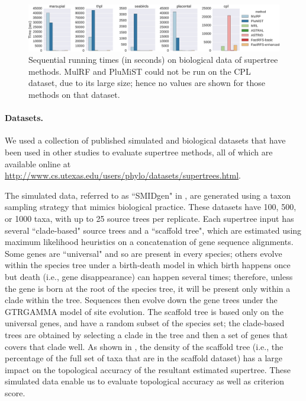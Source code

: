  \begin{figure}
     \centering
     \includegraphics[width=\textwidth]{fastrfs-figs/bio-timing.eps}
     \caption[Running times of FastRFS and other supertree methods on five biological datasets]{Sequential running times (in seconds) on biological data of supertree methods. 
 MulRF and PluMiST could not be run on the CPL dataset, due to its large size; hence
 no values are shown for those methods on that dataset.
 }
     \label{fastrfs::fig:bio-timing}
 \end{figure}




\paragraph{\bf Datasets.  }
We used a collection of published simulated and biological datasets that
have been used in other studies \cite{smidgen} to evaluate supertree methods,
all of which are available online at
\url{http://www.cs.utexas.edu/users/phylo/datasets/supertrees.html}.

The simulated data, referred to as ``SMIDgen" in \cite{smidgen},
are generated
using  a taxon sampling strategy that mimics biological practice. 
These datasets have
100, 500, or 1000 taxa, with up to 25 source trees per replicate. 
Each supertree input has several ``clade-based" source trees and a ``scaffold tree", 
which are estimated using maximum likelihood heuristics on a concatenation 
of gene sequence alignments. 
Some genes are ``universal" and so are present in every species; others
evolve within the species tree under a birth-death model in which birth happens once but death (i.e., gene disappearance) can happen several times; therefore, unless the gene is born at the root of the species tree, it will be present only within a clade within the tree. Sequences then evolve down the gene trees under the GTRGAMMA model of site evolution.
The scaffold tree is based only on the universal genes, and have a random
subset of the species set; the clade-based trees are obtained by
selecting a clade in the tree and then a set of genes that covers
that clade well.
As shown in \cite{smidgen}, the density of the scaffold tree (i.e., the percentage of the full set of taxa that are in the scaffold dataset) has a large impact on the topological accuracy of the resultant estimated supertree.
 These simulated data enable us to evaluate topological accuracy as well as criterion score.
 
